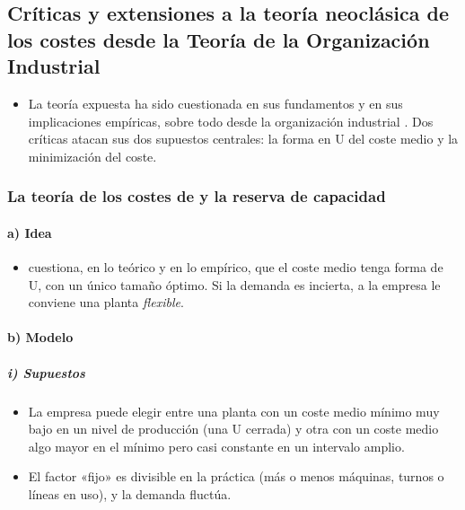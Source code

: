 \documentclass[11pt]{article}
\begin{document}
\subsection{Críticas y extensiones a la teoría neoclásica de los costes\cortetitulo{} desde la Teoría de la Organización Industrial}\label{sec:criticas-extensiones-teoria}

\begin{itemize}
\item La teoría expuesta ha sido cuestionada en sus fundamentos y en sus implicaciones empíricas, sobre todo desde la organización industrial . Dos críticas atacan sus dos supuestos centrales: la forma en U del coste medio y la minimización del coste.
\end{itemize}

\subsubsection{La teoría de los costes de  y la reserva de capacidad}\label{sec:teoria-costes-stigler}

\paragraph{a) Idea}

\begin{itemize}
\item \textcite{Stigler1939Production} cuestiona, en lo teórico y en lo empírico, que el coste medio tenga forma de U, con un único tamaño óptimo. Si la demanda es incierta, a la empresa le conviene una planta \emph{flexible}.
\end{itemize}

\paragraph{b) Modelo}

\subparagraph{i) Supuestos}

\begin{itemize}
\item La empresa puede elegir entre una planta con un coste medio mínimo muy bajo en un nivel de producción (una U cerrada) y otra con un coste medio algo mayor en el mínimo pero casi constante en un intervalo amplio.
\item El factor «fijo» es divisible en la práctica (más o menos máquinas, turnos o líneas en uso), y la demanda fluctúa.
\end{itemize}
\end{document}
